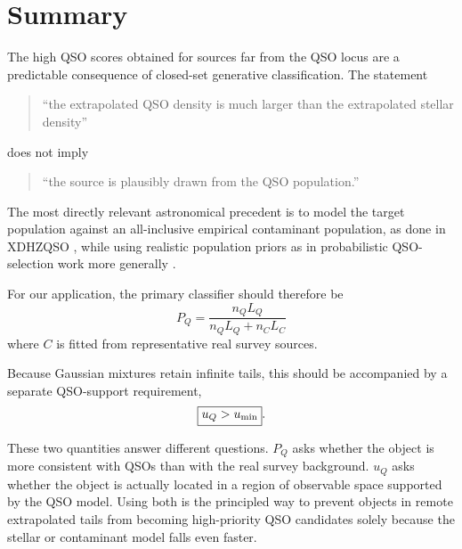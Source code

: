 \documentclass[11pt]{article}
\begin{document}
\section{Summary}

The high QSO scores obtained for sources far from the QSO locus are a
predictable consequence of closed-set generative classification. The statement
%
\begin{quote}
``the extrapolated QSO density is much larger than the extrapolated stellar
density''
\end{quote}
%
does not imply
%
\begin{quote}
``the source is plausibly drawn from the QSO population.''
\end{quote}

The most directly relevant astronomical precedent is to model the target
population against an all-inclusive empirical contaminant population, as done
in XDHZQSO \citep{nanni2022}, while using realistic population priors as in
probabilistic QSO-selection work more generally
\citep{bovy2011xdqso,mortlock2012}.

For our application, the primary classifier should therefore be
%
\begin{equation}
\boxed{
P_Q
=
\frac{n_Q L_Q}
{n_Q L_Q+n_C L_C}
}
\end{equation}
%
where $C$ is fitted from representative real survey sources.

Because Gaussian mixtures retain infinite tails, this should be accompanied
by a separate QSO-support requirement,
%
\begin{equation}
\boxed{
u_Q > u_{\rm min}
}.
\end{equation}

These two quantities answer different questions. $P_Q$ asks whether the
object is more consistent with QSOs than with the real survey background.
$u_Q$ asks whether the object is actually located in a region of observable
space supported by the QSO model. Using both is the principled way to prevent
objects in remote extrapolated tails from becoming high-priority QSO
candidates solely because the stellar or contaminant model falls even faster.
\end{document}
